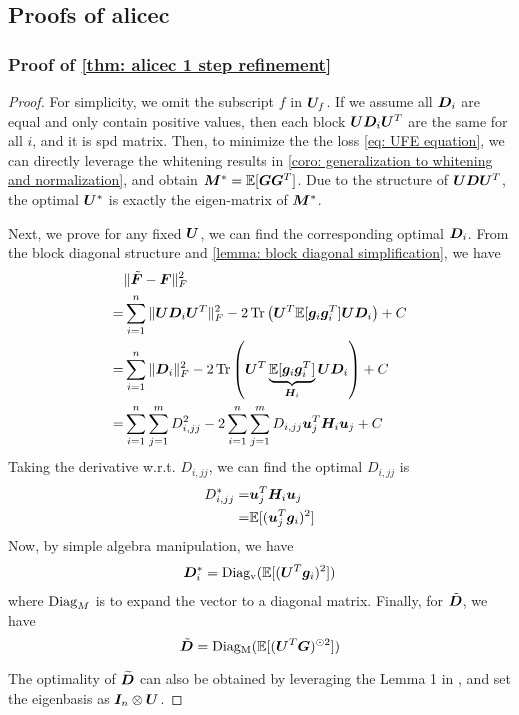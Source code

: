 \subsection{Proofs of \gls{alicec}}
\label{subapp: proofs of alicec}
\subsubsection{Proof of \cref{thm: alicec 1 step refinement}}

\begin{proof}
    For simplicity, we omit the subscript $f$ in ${\bm{U}}_{f}$. If we assume all ${\bm{D}}_i$ are equal and only contain positive values, then each block ${\bm{U}}{\bm{D}}_i{\bm{U}}^T$ are the same for all $i$, and it is \gls{spd} matrix. Then, to minimize the the loss \cref{eq: UFE equation}, we can directly leverage the whitening results in \cref{coro: generalization to whitening and normalization}, and obtain ${\bm{M}}^*=\mathbb{E}[{\bm{G}}{\bm{G}}^T]$. Due to the structure of ${\bm{U}}{\bm{D}}{\bm{U}}^T$, the optimal ${\bm{U}}^*$ is exactly the eigen-matrix of ${\bm{M}}^*$. 

    Next, we prove for any fixed ${\bm{U}}$, we can find the corresponding optimal ${\bm{D}}_i$. 
    From the block diagonal structure and \cref{lemma: block diagonal simplification}, we have
    \begin{align*}
        &\Vert\tilde{\bm{F}}-{\bm{F}}\Vert_F^2\\
        =&\sum_{i=1}^n \Vert{\bm{U}}{\bm{D}}_i{\bm{U}}^T\Vert_F^2 - 2\operatorname{Tr}\left({\bm{U}}^T\mathbb{E}[{\bm{g}}_i{\bm{g}}_i^T]{\bm{U}} {\bm{D}}_i\right) + C\\
        =& \sum_{i=1}^n \Vert{\bm{D}}_i\Vert_F^2 - 2\operatorname{Tr}\left({\bm{U}}^T\underbrace{\mathbb{E}[{\bm{g}}_i{\bm{g}}_i^T]}_{{\bm{H}}_i}{\bm{U}}{\bm{D}}_i\right) + C\\
        =&\sum_{i=1}^n\sum_{j=1}^m D_{i,jj}^2 - 2\sum_{i=1}^n\sum_{j=1}^m D_{i,jj}{\bm{u}}_j^T{\bm{H}}_i{\bm{u}}_j + C
    \end{align*}
Taking the derivative w.r.t. $D_{i,jj}$, we can find the optimal $D_{i,jj}$ is 
\begin{align*}
    D^*_{i,jj} =& {\bm{u}}_j^T{\bm{H}}_i{\bm{u}}_j\\
    =& \mathbb{E}[({\bm{u}}_j^T{\bm{g}}_i)^2]
\end{align*}
Now, by simple algebra manipulation, we have
\begin{align*}
    {\bm{D}}^*_i = \operatorname{Diag_v}(\mathbb{E}[({\bm{U}}^T{\bm{g}}_i)^2])
\end{align*}
where $\operatorname{Diag}_M$ is to expand the vector to a diagonal matrix. 
Finally, for $\tilde{{\bm{D}}}$, we have
\begin{equation}
    \tilde{{\bm{D}}} = \operatorname{Diag_M}(\mathbb{E}[({\bm{U}}^T{\bm{G}})^{\odot 2}])
\end{equation}

The optimality of $\widetilde{{\bm{D}}}$ can also be obtained by leveraging the Lemma 1 in \citep{george2018fast}, and set the eigenbasis as ${\bm{I}}_n\otimes {\bm{U}}$. 
\end{proof}